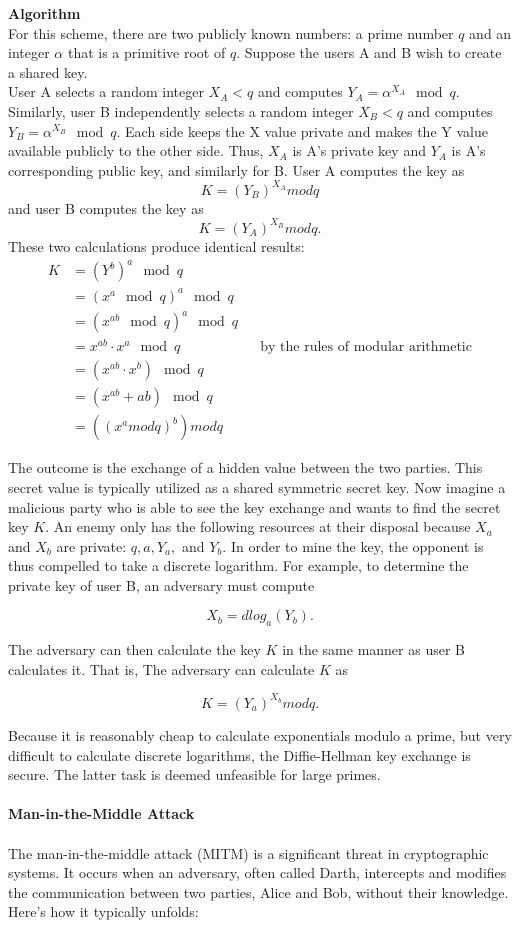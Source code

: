 \documentclass[11pt]{article}
\begin{document}
\textbf{Algorithm}\\
For this scheme, there are two publicly known numbers: a prime number \(q\) and an integer \( \alpha \) that is a primitive root of \( q \). Suppose the users A and B wish to create a shared key.\\
User A selects a random integer \( X_A < q \) and computes \( Y_A = \alpha^{X_A} \mod q \). Similarly, user B independently selects a random integer \( X_B < q \) and computes \( Y_B = \alpha^{X_B} \mod q \). Each side keeps the X value private and makes the Y value available publicly to the other side. Thus, \( X_A\) is A's private key and \( Y_A\) is A's corresponding public key, and similarly for B. User A computes the key as 
\[ K = (Y_B)^{X_A}  mod  q\]
and user B computes the key as 
\[ K = (Y_A)^{X_B}  mod  q.\] 
\newpage
These two calculations produce identical results:\\
\begin{align*}
K & = (Y^b)^a \mod q \\
& = (x^a \mod q)^a \mod q \\
& = (x^{ab} \mod q)^a \mod q \\
& = x^{ab} \cdot x^a \mod q & & \text{by the rules of modular arithmetic} \\
& = (x^{ab} \cdot x^b) \mod q \\
& = (x^{ab} + ab)  \mod q \\
& = ((x^a  mod  q)^b)  mod  q
\end{align*}

The outcome is the exchange of a hidden value between the two parties. This secret value is typically utilized as a shared symmetric secret key. Now imagine a malicious party who is able to see the key exchange and wants to find the secret key \( K \). An enemy only has the following resources at their disposal because \(X_a\) and \(X_b\) are private: \(q, a, Y_a,\) and \( Y_b\). In order to mine the key, the opponent is thus compelled to take a discrete logarithm. For example, to determine the private key of user B, an adversary must compute

\[ X_b = dlog_a(Y_b) .\]

The adversary can then calculate the key \( K\) in the same manner as user B calculates it. That is, The adversary can calculate \( K\) as

\[ K= (Y_a)^{X_b} mod  q .\]

Because it is reasonably cheap to calculate exponentials modulo a prime, but very difficult to calculate discrete logarithms, the Diffie-Hellman key exchange is secure. The latter task is deemed unfeasible for large primes.\\\\
\textbf{Man-in-the-Middle Attack}\\\\
The man-in-the-middle attack (MITM) is a significant threat in cryptographic systems. It occurs when an adversary, often called Darth, intercepts and modifies the communication between two parties, Alice and Bob, without their knowledge. Here's how it typically unfolds:
\end{document}
